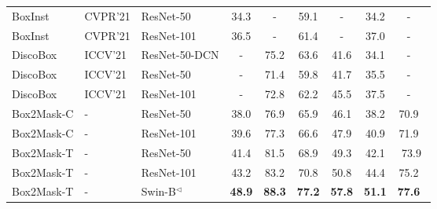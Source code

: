 \documentclass[12pt,onecolumn,letterpaper]{article}
\begin{document}
\begin{table*}[t]
{{\begin{tabular}{lllcccccc}
			
			BoxInst~\cite{cvpr2021_boxinst}  &CVPR'21 & ResNet-50 & 34.3 &- & 59.1 & -  & 34.2  & -~\\ 
			BoxInst~\cite{cvpr2021_boxinst}  &CVPR'21 & ResNet-101 & 36.5& - & 61.4 & - & 37.0 & -~ \\ 
			
			DiscoBox~\cite{iccv2021discobox} &ICCV'21  & ResNet-50-DCN &-& 75.2 &63.6 & 41.6& 34.1 &-~\\ 
			DiscoBox~\cite{iccv2021discobox}  &ICCV'21 & ResNet-50 & - & 71.4& 59.8& 41.7& 35.5 &-~\\ 
			DiscoBox~\cite{iccv2021discobox}  &ICCV'21 & ResNet-101 & - & 72.8 &62.2 & 45.5 & 37.5 &-~\\ 
			
			\hline
			\rowcolor{gray!8}
			Box2Mask-C   & - & ResNet-50 & 38.0 & 76.9& 65.9& 46.1 & 38.2  & 70.9~ \\
			\rowcolor{gray!8}
			Box2Mask-C & - & ResNet-101 & 39.6 & 77.3 & 66.6 & 47.9 & 40.9 & 71.9~ \\
			
			\rowcolor{gray!8}
			Box2Mask-T  & - & ResNet-50 & 41.4 & 81.5 & 68.9  & 49.3 & 42.1 & 73.9  \\
			\rowcolor{gray!8}
			Box2Mask-T  & - & ResNet-101 & 43.2 & 83.2 & 70.8 & 50.8 & 44.4 & 75.2~\\
			\rowcolor{gray!8}
			Box2Mask-T  & - & Swin-B$^\triangleleft$ & \textbf{48.9} & \textbf{88.3} & \textbf{77.2} & \textbf{57.8} & \textbf{51.1} & \textbf{77.6}~\\
			\bottomrule
	\end{tabular}}}
	\label{tab:vocsota}
\end{table*}
\end{document}
